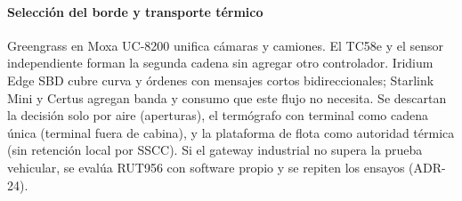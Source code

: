 \paragraph{Selección del borde y transporte térmico}
Greengrass en Moxa UC-8200 unifica cámaras y camiones. El TC58e y el sensor independiente forman la segunda cadena sin agregar otro controlador. Iridium Edge SBD cubre curva y órdenes con mensajes cortos bidireccionales; Starlink Mini y Certus agregan banda y consumo que este flujo no necesita. Se descartan la decisión solo por aire (aperturas), el termógrafo con terminal como cadena única (terminal fuera de cabina), y la plataforma de flota como autoridad térmica (sin retención local por SSCC). Si el gateway industrial no supera la prueba vehicular, se evalúa RUT956 con software propio y se repiten los ensayos (ADR-24).
